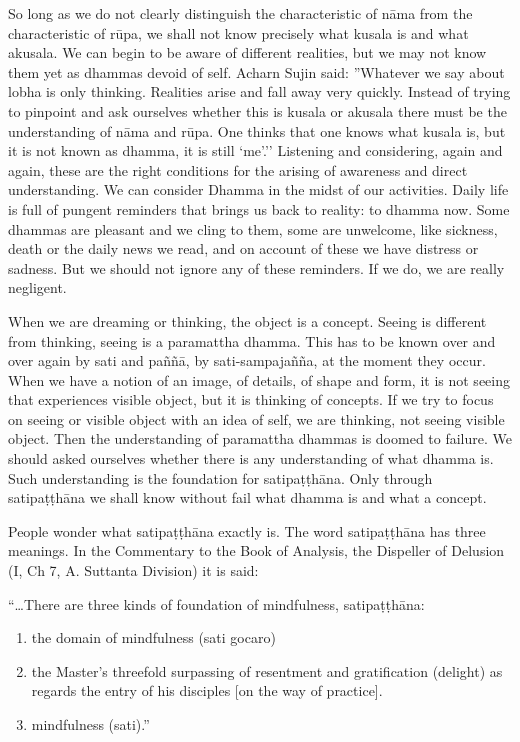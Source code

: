 So long as we do not clearly distinguish the characteristic of nāma from the characteristic of rūpa, we shall not know precisely what kusala is and what akusala. We can begin to be aware of different realities, but we may not know them yet as dhammas devoid of self. Acharn Sujin said: ''Whatever we say about lobha is only thinking. Realities arise and fall away very quickly. Instead of trying to pinpoint and ask ourselves whether this is kusala or akusala there must be the understanding of nāma and rūpa. One thinks that one knows what kusala is, but it is not known as dhamma, it is still `me’.'' Listening and considering, again and again, these are the right conditions for the arising of awareness and direct understanding. We can consider Dhamma in the midst of our activities. Daily life is full of pungent reminders that brings us back to reality: to dhamma now. Some dhammas are pleasant and we cling to them, some are unwelcome, like sickness, death or the daily news we read, and on account of these we have distress or sadness. But we should not ignore any of these reminders. If we do, we are really negligent.

When we are dreaming or thinking, the object is a concept. Seeing is different from thinking, seeing is a paramattha dhamma. This has to be known over and over again by sati and paññā, by sati-sampajañña, at the moment they occur. When we have a notion of an image, of details, of shape and form, it is not seeing that experiences visible object, but it is thinking of concepts. If we try to focus on seeing or visible object with an idea of self, we are thinking, not seeing visible object. Then the understanding of paramattha dhammas is doomed to failure. We should asked ourselves whether there is any understanding of what dhamma is. Such understanding is the foundation for satipaṭṭhāna. Only through satipaṭṭhāna we shall know without fail what dhamma is and what a concept.

People wonder what satipaṭṭhāna exactly is. The word satipaṭṭhāna has three meanings. In the Commentary to the Book of Analysis, the Dispeller of Delusion (I, Ch 7, A. Suttanta Division) it is said: 

``\ldots There are three kinds of foundation of mindfulness, satipaṭṭhāna:

\begin{enumerate}
\item the domain of mindfulness (sati gocaro)
\item the Master’s threefold surpassing of resentment and gratification (delight) as regards the entry of his disciples [on the way of practice].
\item mindfulness (sati).''
\end{enumerate}

